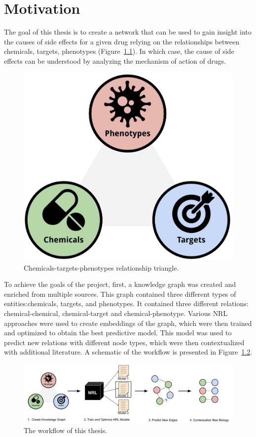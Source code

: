 \chapter{Motivation}\label{motivation}

The goal of this thesis is to create a network that can be used to gain insight into the causes of side effects for a given drug relying on the relationships between chemicals, targets, phenotypes (Figure~\ref{fig:triangle}).
In which case, the cause of side effects can be understood by analyzing the mechanism of action of drugs.

\begin{figure}[!ht]
    \centering
    \includegraphics[scale=0.175]
    {figures/triangle.jpg}
    \caption{\label{fig:triangle} Chemicals-targets-phenotypes relationship triangle.}
\end{figure}

To achieve the goals of the project, first, a knowledge graph was created and enriched from multiple sources.
This graph contained three different types of entities:chemicals, targets, and phenotypes.
It contained three different relations: chemical-chemical, chemical-target and chemical-phenotype.
Various \ac{NRL} approaches were used to create embeddings of the graph, which were then trained and optimized to obtain the best predictive model.
This model was used to predict new relations with different node types, which were then contextualized with additional literature.
A schematic of the workflow is presented in Figure~\ref{fig:workflow}.

\begin{figure}[!ht]
    \centering
    \includegraphics[scale=0.39]
    {figures/workflow.jpg}
    \caption{\label{fig:workflow} The workflow of this thesis.}
\end{figure}
